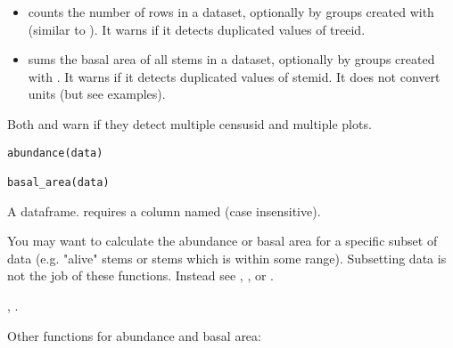 \documentclass[a4paper]{book}
\begin{document}
%
\begin{Description}\relax
\begin{itemize}

\item {} counts the number of rows in a dataset, optionally by groups
created with  (similar to ). It warns if it
detects duplicated values of treeid.
\item {} sums the basal area of
all stems in a dataset, optionally by groups created with . It
warns if it detects duplicated values of stemid. It does not convert units
(but see examples).

\end{itemize}


Both  and  warn if they detect
multiple censusid and multiple plots.
\end{Description}
%
\begin{Usage}
\begin{verbatim}
abundance(data)

basal_area(data)
\end{verbatim}
\end{Usage}
%
\begin{Arguments}
\begin{ldescription}
\item[\code{data}] A dataframe.  requires a column named  (case
insensitive).
\end{ldescription}
\end{Arguments}
%
\begin{Details}\relax
You may want to calculate the abundance or basal area for a specific subset
of data (e.g. "alive" stems or stems which  is within some range).
Subsetting data is not the job of these functions. Instead see
, , or \code{[}.
\end{Details}
%
\begin{SeeAlso}\relax
{}, .

Other functions for abundance and basal area: 
\end{SeeAlso}
\end{document}
